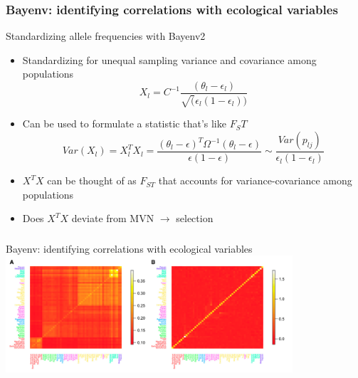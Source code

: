 \begin{frame}
\frametitle{Bayenv: identifying correlations with ecological
variables}
\begin{block}{Standardizing allele frequencies with Bayenv2}
\begin{itemize}
\item{Standardizing for unequal sampling variance and covariance 
among populations}
\begin{equation}
X_l = C^{-1} \frac{(\theta_l-\epsilon_l)}{\sqrt(\epsilon_l(1-\epsilon_l))}	
\end{equation}
\item{Can be used to formulate a statistic that's like $F_ST$}
\begin{equation}
Var(X_l) = X_l^T X_l =
\frac{(\theta_l-\epsilon)^T\Omega^{-1}(\theta_l-\epsilon)}
{\epsilon(1-\epsilon)} \sim 
\frac{Var(p_{lj})}{\epsilon_l(1-\epsilon_l)}
\end{equation}
\item{$X^TX$ can be thought of as $F_{ST}$ that accounts for
variance-covariance among populations}
\item{Does $X^TX$ deviate from MVN $\longrightarrow$ selection}
\end{itemize}
\end{block}
\end{frame}

\begin{frame}
\frametitle{}
\begin{block}{Bayenv: identifying correlations with ecological
variables}
\centering
\includegraphics[width=0.8\textwidth]{xtx.png}\\
\tiny
\citet[Figure 2]{Gunther:2013ik}
\end{block}
\end{frame}

